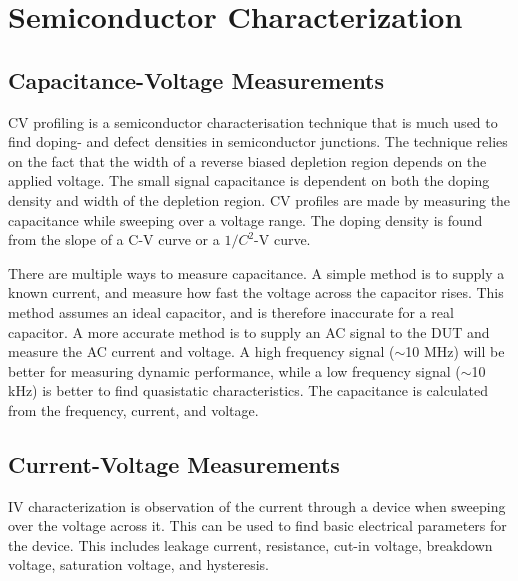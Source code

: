 \documentclass[../main/thesis.tex]{subfiles}
\begin{document}



\section{Semiconductor Characterization}
\label{t-char}

\subsection{Capacitance-Voltage Measurements}
\label{t-cv}
\gls{CV} profiling is a semiconductor characterisation technique that is much used to find doping- and defect densities in semiconductor junctions. The technique relies on the fact that the width of a reverse biased depletion region depends on the applied voltage. The small signal capacitance is dependent on both the doping density and width of the depletion region. \gls{CV} profiles are made by measuring the capacitance while sweeping over a voltage range. The doping density is found from the slope of a C-V curve or a $1/C^2$-V curve. \citep[chap. 2]{Schroder}

There are multiple ways to measure capacitance. A simple method is to supply a known current, and measure how fast the voltage across the capacitor rises. This method assumes an ideal capacitor, and is therefore inaccurate for a real capacitor. A more accurate method is to supply an AC signal to the \gls{DUT} and measure the AC current and voltage. A high frequency signal ($\sim$10 MHz) will be better for measuring dynamic performance, while a low frequency signal ($\sim$10 kHz) is better to find quasistatic characteristics. The capacitance is calculated from the frequency, current, and voltage. 


\subsection{Current-Voltage Measurements}
\label{t-iv}
\gls{IV} characterization is observation of the current through a device when sweeping over the voltage across it. This can be used to find basic electrical parameters for the device. This includes leakage current, resistance, cut-in voltage, breakdown voltage, saturation voltage, and hysteresis. 
\end{document}
